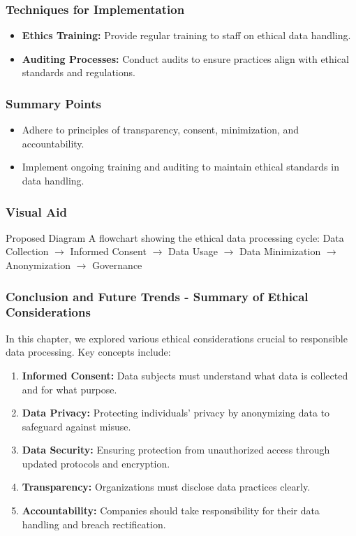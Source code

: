 \documentclass{beamer}
\begin{document}
\begin{frame}[fragile]
    \frametitle{Techniques for Implementation}
    \begin{itemize}
        \item \textbf{Ethics Training:} Provide regular training to staff on ethical data handling.
        \item \textbf{Auditing Processes:} Conduct audits to ensure practices align with ethical standards and regulations.
    \end{itemize}
\end{frame}

\begin{frame}[fragile]
    \frametitle{Summary Points}
    \begin{itemize}
        \item Adhere to principles of transparency, consent, minimization, and accountability.
        \item Implement ongoing training and auditing to maintain ethical standards in data handling.
    \end{itemize}
\end{frame}

\begin{frame}[fragile]
    \frametitle{Visual Aid}
    \begin{block}{Proposed Diagram}
        A flowchart showing the ethical data processing cycle: 
        Data Collection $\to$ Informed Consent $\to$ Data Usage $\to$ Data Minimization $\to$ Anonymization $\to$ Governance
    \end{block}
\end{frame}

\begin{frame}[fragile]
    \frametitle{Conclusion and Future Trends - Summary of Ethical Considerations}
    In this chapter, we explored various ethical considerations crucial to responsible data processing. Key concepts include:
    \begin{enumerate}
        \item \textbf{Informed Consent:} 
        Data subjects must understand what data is collected and for what purpose.
        
        \item \textbf{Data Privacy:} 
        Protecting individuals' privacy by anonymizing data to safeguard against misuse.
        
        \item \textbf{Data Security:} 
        Ensuring protection from unauthorized access through updated protocols and encryption.
        
        \item \textbf{Transparency:} 
        Organizations must disclose data practices clearly.
        
        \item \textbf{Accountability:} 
        Companies should take responsibility for their data handling and breach rectification.
    \end{enumerate}
\end{frame}
\end{document}
